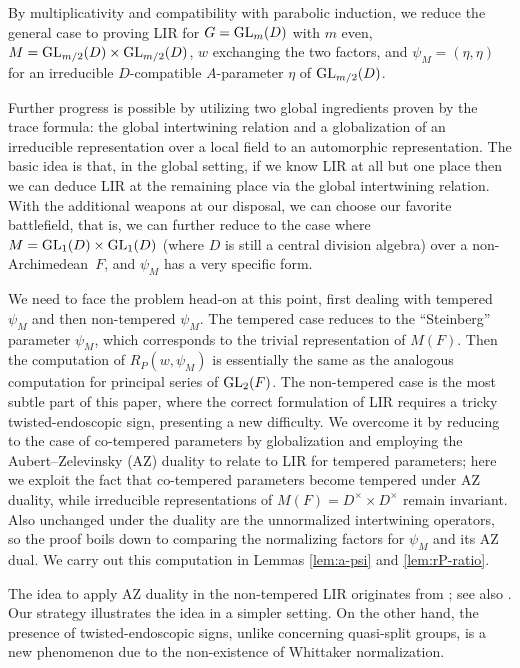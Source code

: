\documentclass[11pt,reqno]{amsart}
\theoremstyle{plain}
\theoremstyle{definition}
\newcommand{\GL}{\tu{GL}}
\newcommand{\tu}{\textup}
\numberwithin{equation}{subsection}
\begin{document}
By multiplicativity and compatibility with parabolic induction, we reduce the general case to proving LIR for $G=\GL_{m}(D)$ with $m$ even, $M=\GL_{m/2}(D)\times\GL_{m/2}(D)$, $w$ exchanging the two factors, and $\psi_M=(\eta,\eta)$ for an
irreducible $D$-compatible $A$-parameter $\eta$ of $\GL_{m/2}(D)$.

Further progress is possible by utilizing two global ingredients proven by the trace formula: the global intertwining relation and a globalization of an irreducible representation over a local field to an automorphic representation. The basic idea is that, in the global setting, if we know LIR at all but one place then we can deduce LIR at the remaining place via the global intertwining relation. With the additional weapons at our disposal, we can choose our favorite battlefield, that is, we can further reduce to the case where $M=\GL_1(D)\times \GL_1(D)$ (where $D$ is still a central division algebra) over a non-Archimedean~$F$, and $\psi_M$ has a very specific form.

We need to face the problem head-on at this point, first dealing with tempered $\psi_M$ and then non-tempered $\psi_M$. 
The tempered case reduces to the ``Steinberg'' parameter $\psi_M$, which corresponds to the trivial representation of $M(F)$. Then the computation of $R_P(w,\psi_M)$ is essentially the same as the analogous computation for principal series of $\GL_2(F)$. The non-tempered case is the most subtle part of this paper, where the correct formulation of LIR requires a tricky twisted-endoscopic sign, presenting a new difficulty. We overcome it by reducing to the case of co-tempered parameters by globalization and employing the Aubert--Zelevinsky (AZ) duality to relate to LIR for tempered parameters; here we exploit the fact that co-tempered parameters become tempered under AZ duality, while irreducible representations of $M(F)=D^\times\times D^\times$ remain invariant. Also unchanged under the duality are the unnormalized intertwining operators, so the proof boils down to comparing the normalizing factors for $\psi_M$ and its AZ dual. We carry out this computation in Lemmas \ref{lem:a-psi} and \ref{lem:rP-ratio}.

The idea to apply AZ duality in the non-tempered LIR originates from \cite[Ch.7]{Arthur}; see also \cite{AGIKMS}. Our strategy illustrates the idea in a simpler setting. On the other hand, the presence of twisted-endoscopic signs, unlike \cite{Arthur,AGIKMS} concerning quasi-split groups, is a new phenomenon due to the non-existence of Whittaker normalization.
\end{document}
